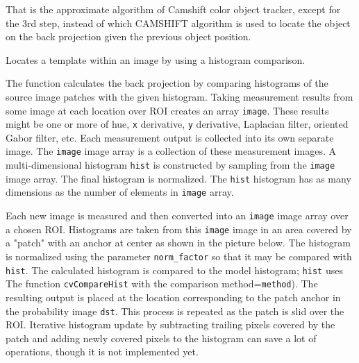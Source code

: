 That is the approximate algorithm of Camshift color object tracker, except for the 3rd step, instead of which CAMSHIFT algorithm is used to locate the object on the back projection given the previous object position.

Locates a template within an image by using a histogram comparison.


\begin{description}
\end{description}

The function calculates the back projection by comparing histograms of the source image patches with the given histogram. Taking measurement results from some image at each location over ROI creates an array \texttt{image}. These results might be one or more of hue, \texttt{x} derivative, \texttt{y} derivative, Laplacian filter, oriented Gabor filter, etc. Each measurement output is collected into its own separate image. The \texttt{image} image array is a collection of these measurement images. A multi-dimensional histogram \texttt{hist} is constructed by sampling from the \texttt{image} image array. The final histogram is normalized. The \texttt{hist} histogram has as many dimensions as the number of elements in \texttt{image} array.

Each new image is measured and then converted into an \texttt{image} image array over a chosen ROI. Histograms are taken from this \texttt{image} image in an area covered by a "patch" with an anchor at center as shown in the picture below. The histogram is normalized using the parameter \texttt{norm\_factor} so that it may be compared with \texttt{hist}. The calculated histogram is compared to the model histogram; \texttt{hist} uses The function \texttt{cvCompareHist} with the comparison method=\texttt{method}). The resulting output is placed at the location corresponding to the patch anchor in the probability image \texttt{dst}. This process is repeated as the patch is slid over the ROI. Iterative histogram update by subtracting trailing pixels covered by the patch and adding newly covered pixels to the histogram can save a lot of operations, though it is not implemented yet.


